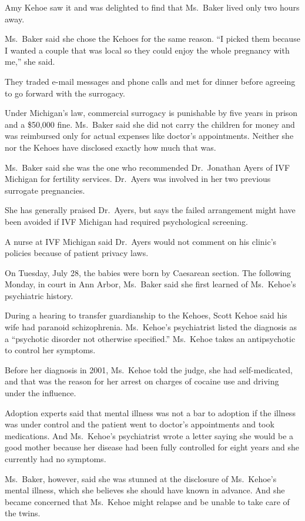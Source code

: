 ﻿\documentclass[12pt]{article}
\begin{document}
Amy Kehoe saw it and was delighted to find that Ms.~Baker lived only two hours away.

Ms.~Baker said she chose the Kehoes for the same reason. ``I picked them because I wanted a couple
that was local so they could enjoy the whole pregnancy with me,'' she said.

They traded e-mail messages and phone calls and met for dinner before agreeing to go forward with
the surrogacy.

Under Michigan's law, commercial surrogacy is punishable by five years in prison and a \$50,000
fine. Ms.~Baker said she did not carry the children for money and was reimbursed only for actual
expenses like doctor's appointments. Neither she nor the Kehoes have disclosed exactly how much that
was.

Ms.~Baker said she was the one who recommended Dr.~Jonathan Ayers of IVF Michigan for fertility
services. Dr.~Ayers was involved in her two previous surrogate pregnancies.

She has generally praised Dr.~Ayers, but says the failed arrangement might have been avoided if IVF
Michigan had required psychological screening.

A nurse at IVF Michigan said Dr.~Ayers would not comment on his clinic's policies because of patient
privacy laws.

On Tuesday, July 28, the babies were born by Caesarean section. The following Monday, in court in
Ann Arbor, Ms.~Baker said she first learned of Ms.~Kehoe's psychiatric history.

During a hearing to transfer guardianship to the Kehoes, Scott Kehoe said his wife had paranoid
schizophrenia. Ms.~Kehoe's psychiatrist listed the diagnosis as a ``psychotic disorder not otherwise
specified.'' Ms.~Kehoe takes an antipsychotic to control her symptoms.

Before her diagnosis in 2001, Ms.~Kehoe told the judge, she had self-medicated, and that was the
reason for her arrest on charges of cocaine use and driving under the influence.

Adoption experts said that mental illness was not a bar to adoption if the illness was under control
and the patient went to doctor's appointments and took medications. And Ms.~Kehoe's psychiatrist
wrote a letter saying she would be a good mother because her disease had been fully controlled for
eight years and she currently had no symptoms.

Ms.~Baker, however, said she was stunned at the disclosure of Ms.~Kehoe's mental illness, which she
believes she should have known in advance. And she became concerned that Ms.~Kehoe might relapse and
be unable to take care of the twins.
\end{document}
